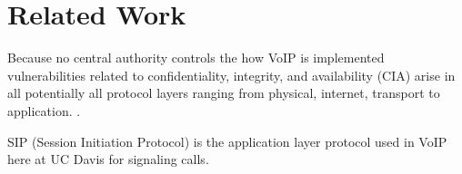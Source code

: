 \section{Related Work}

Because no central authority controls the how VoIP is implemented vulnerabilities related to confidentiality, integrity, and availability (CIA) arise in all potentially all protocol layers ranging from physical, internet, transport to application. \cite{mcgann}. 

SIP (Session Initiation Protocol) is the application layer protocol used in VoIP here at UC Davis for signaling calls. 